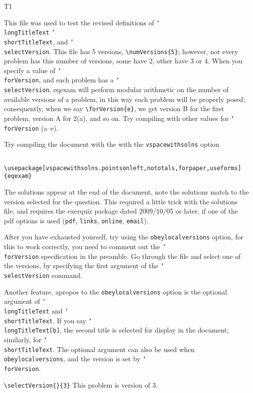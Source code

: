\documentclass{article}
\title[\sExam]{\Exam}
\author{Dr.\ D. P. Story}
\date{\thisterm, \the\year}
\newcommand{\cs}[1]{\texttt{\char`\\#1}}
\begin{document}
\maketitle

\begin{exam}{T1}

\begin{eqComments}[Instructions:]
This file was used to test the revised definitions of
\cs{longTitleText} \cs{shortTitleText}, and \cs{selectVersion}. This
file has 5 versions, \verb!\numVersions{5}!; however, not every
problem has this number of versions, some have 2, other have 3 or 4.
When you specify a value of \cs{forVersion}, and each problem has a
\cs{selectVersion}, \textsf{eqexam} will perform modular arithmetic
on the number of available versions of a problem, in this way each
problem will be properly posed; consequently, when we say
\verb!\forVersion{e}!, we get version B for the first problem,
version A for 2(a), and so on. Try compiling with other values for
\cs{forVersion} (a--e).

Try compiling the document with the with the \texttt{vspacewithsolns} option
\begin{verbatim}
    \usepackage[vspacewithsolns.pointsonleft,nototals,forpaper,useforms]{eqexam}
\end{verbatim}
The solutions appear at the end of the document, note the solutions
match to the version selected for the question.  This required a
little trick with the solutions file, and requires the exerquiz
package dated 2009/10/05 or later, if one of the pdf options is
used (\texttt{pdf}, \texttt{links}, \texttt{online},
\texttt{email}).

After you have exhausted yourself, try using the \texttt{obeylocalversions} option,
for this to work correctly, you need to comment out the \cs{forVersion} specification
in the preamble.  Go through the file and select one of the versions, by specifying
the first argument of the \cs{selectVersion} command.

Another feature, apropos to the \texttt{obeylocalversions} option is the optional
argument of \cs{longTitleText} and \cs{shortTitleText}. If you say
\cs{longTitleText[b]}, the second title is selected for display in the document;
similarly, for \cs{shortTitleText}. The optional argument can also be used
when \texttt{obeylocalversions}, and the version is set by \cs{forVersion}.
\end{eqComments}

\begin{problem}[5]
\verb!\selectVersion{}{3}! This problem is version  of 3.


\end{problem}
\end{exam}
\end{document}
